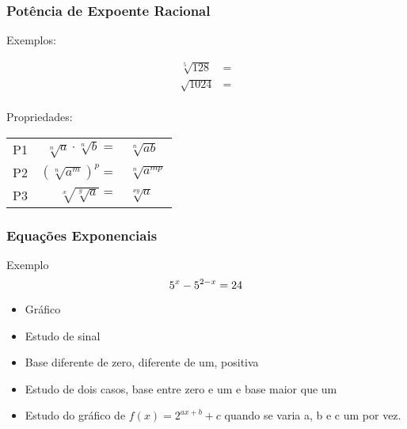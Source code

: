 \subsubsection{Potência de Expoente Racional}


\begin{center}
\end{center}

Exemplos:

\begin{align*}
 \sqrt[5]{128}&=\\
 \sqrt{1024}&=\\
\end{align*}

Propriedades:

\begin{tabular}{lrl}

 P1 & $\sqrt[n]{a} \cdot \sqrt[n]{b}=$ &$\sqrt[n]{ab}$ \\

 P2 & $(\sqrt[n]{a^m})^p=$ & $\sqrt[n]{a^{mp}}$\\

 P3 & $\sqrt[x]{\sqrt[y]{a}}=$ & $\sqrt[xy]{a}$ \\

\end{tabular}

\subsubsection{Equações Exponenciais}

Exemplo
\begin{equation}
 5^x-5^{2-x}=24\\
\end{equation}

\begin{itemize}
 \item Gráfico
 \item Estudo de sinal
 \item Base diferente de zero, diferente de um, positiva
 \item Estudo de dois casos, base entre zero e um e base maior que um
 \item Estudo do gráfico de $f(x)=2^{ax+b}+c$ quando se varia a, b e c um por vez.
\end{itemize}

